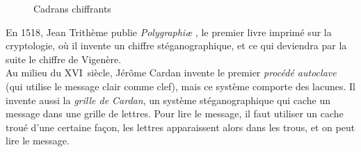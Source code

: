 \begin{figure}[h]
  \begin{center}
    \hspace{1.5cm}

  \end{center}
  \vspace{-10pt}
  \caption{Cadrans chiffrants}
  \vspace{-15pt}
\end{figure}

En 1518, Jean Trithème publie \emph{Polygraphi\ae} , le premier livre imprimé
sur la cryptologie, où il invente un chiffre stéganographique, et ce
qui deviendra par la suite le chiffre de
Vigenère. \\

Au milieu du XVI\ieme~siècle, Jérôme Cardan invente le premier
\emph{procédé autoclave} (qui utilise le message clair comme clef),
mais ce système comporte des lacunes. Il invente aussi la \emph{grille
  de Cardan}, un système stéganographique qui cache un message dans
une grille de lettres. Pour lire le message, il faut utiliser un cache
troué d'une certaine façon, les lettres apparaissent alors dans les
trous, et on peut lire le message. \\

